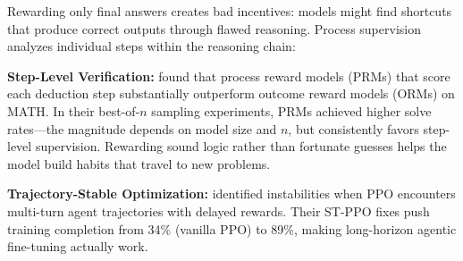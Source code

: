 \documentclass[12pt,a4paper]{report}
\theoremstyle{definition}
\begin{document}
Rewarding only final answers creates bad incentives: models might find shortcuts that produce correct outputs through flawed reasoning. Process supervision analyzes individual steps within the reasoning chain:

\textbf{Step-Level Verification:} \citet{lightman2023lets} found that process reward models (PRMs) that score each deduction step substantially outperform outcome reward models (ORMs) on MATH. In their best-of-$n$ sampling experiments, PRMs achieved higher solve rates---the magnitude depends on model size and $n$, but consistently favors step-level supervision. Rewarding sound logic rather than fortunate guesses helps the model build habits that travel to new problems.

\textbf{Trajectory-Stable Optimization:} \citet{li2025stppo} identified instabilities when PPO encounters multi-turn agent trajectories with delayed rewards. Their ST-PPO fixes push training completion from 34\% (vanilla PPO) to 89\%, making long-horizon agentic fine-tuning actually work.
\end{document}
